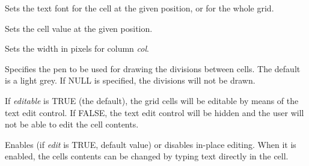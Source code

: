 \label{wxgridsetcelltextfont}



Sets the text font for the cell at the given position, or for the whole grid.


\label{wxgridsetcellvalue}


Sets the cell value at the given position.

\label{wxgridsetcolumnwidth}


Sets the width in pixels for column {\it col}.

\label{wxgridsetdividerpen}


Specifies the pen to be used for drawing the divisions between cells. The default
is a light grey. If NULL is specified, the divisions will not be drawn.

\label{wxgridseteditable}


If {\it editable} is TRUE (the default), the grid cells will be editable by means of the
text edit control. If FALSE, the text edit control will be hidden and the user will not
be able to edit the cell contents.

\label{wxgridseteditinplace}


Enables (if {\it edit} is TRUE, default value) or disables in-place editing.
When it is enabled, the cells contents can be changed by typing text directly
in the cell.

